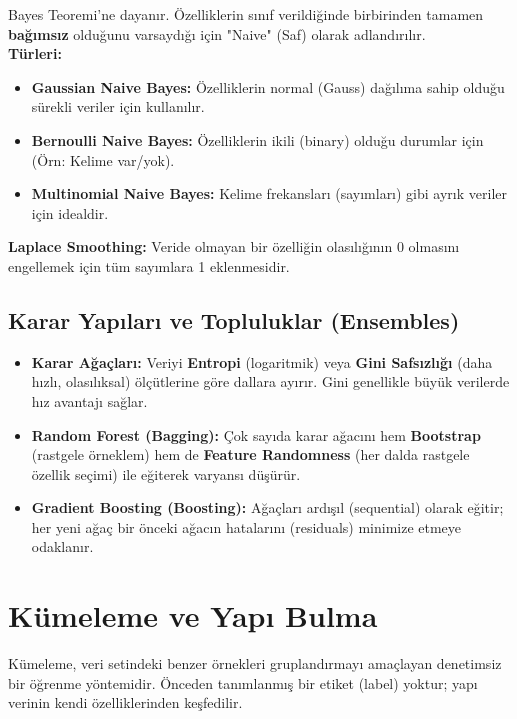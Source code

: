 \documentclass[12pt,a4paper]{article}
\begin{document}
Bayes Teoremi'ne dayanır. Özelliklerin sınıf verildiğinde birbirinden tamamen \textbf{bağımsız} olduğunu varsaydığı için "Naive" (Saf) olarak adlandırılır.
\\ \textbf{Türleri:}
\begin{itemize}
    \item \textbf{Gaussian Naive Bayes:} Özelliklerin normal (Gauss) dağılıma sahip olduğu sürekli veriler için kullanılır.
    \item \textbf{Bernoulli Naive Bayes:} Özelliklerin ikili (binary) olduğu durumlar için (Örn: Kelime var/yok).
    \item \textbf{Multinomial Naive Bayes:} Kelime frekansları (sayımları) gibi ayrık veriler için idealdir.
\end{itemize}
\textbf{Laplace Smoothing:} Veride olmayan bir özelliğin olasılığının 0 olmasını engellemek için tüm sayımlara 1 eklenmesidir.

\subsection{Karar Yapıları ve Topluluklar (Ensembles)}
\begin{itemize}
    \item \textbf{Karar Ağaçları:} Veriyi \textbf{Entropi} (logaritmik) veya \textbf{Gini Safsızlığı} (daha hızlı, olasılıksal) ölçütlerine göre dallara ayırır. Gini genellikle büyük verilerde hız avantajı sağlar.
    \item \textbf{Random Forest (Bagging):} Çok sayıda karar ağacını hem \textbf{Bootstrap} (rastgele örneklem) hem de \textbf{Feature Randomness} (her dalda rastgele özellik seçimi) ile eğiterek varyansı düşürür.
    \item \textbf{Gradient Boosting (Boosting):} Ağaçları ardışıl (sequential) olarak eğitir; her yeni ağaç bir önceki ağacın hatalarını (residuals) minimize etmeye odaklanır.
\end{itemize}

\newpage
\section{Kümeleme ve Yapı Bulma}
Kümeleme, veri setindeki benzer örnekleri gruplandırmayı amaçlayan denetimsiz bir öğrenme yöntemidir. Önceden tanımlanmış bir etiket (label) yoktur; yapı verinin kendi özelliklerinden keşfedilir.
\end{document}
